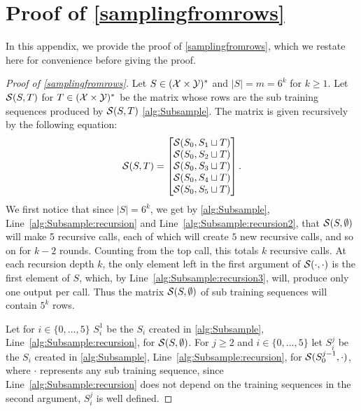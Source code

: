\section{Proof of \cref{samplingfromrows}}\label{appendixefficentoptimalpaclearner}
In this appendix, we provide the proof of \cref{samplingfromrows}, which we restate here for convenience before giving the proof.
\samplingfromrows*

\begin{proof}[Proof of \cref{samplingfromrows}]
    Let $S\in (\mathcal{X}\times \mathcal{Y})^{*}$ and $|S|=m=6^{k}$ for $k\geq 1$. Let $\mathcal{S}(S,T)$ for $T\in (\mathcal{X}\times \mathcal{Y})^{*}$ be the matrix whose rows are the sub training sequences produced by $\mathcal{S}(S,T)$ \cref{alg:Subsample}. The matrix is given recursively by the following equation:  
    \begin{align*}
      \mathcal{S}(S,T)=
      \begin{bmatrix}
        \mathcal{S}(S_0,S_{1}\sqcup T)\\
        \mathcal{S}(S_0,S_{2}\sqcup T)\\
        \mathcal{S}(S_{0},S_{3}\sqcup T)\\
        \mathcal{S}(S_{0},S_{4}\sqcup T)\\
        \mathcal{S}(S_{0},S_{5}\sqcup T)
      \end{bmatrix}.
    \end{align*}
  We first notice that since $|S|=6^{k}$, we get by \cref{alg:Subsample}, Line~\ref{alg:Subsample:recursion} and Line~\ref{alg:Subsample:recursion2}, that   $\mathcal{S}(S,\emptyset)$ will make 5 recursive calls, each of which will create $5$ new recursive calls, and so on for $k-2$ rounds. Counting from the top call, this totals $k$ recursive calls. At each recursion depth $k$, the only element left in the first argument of $\mathcal{S}(\cdot,\cdot)$ is the first element of $S$, which, by Line~\ref{alg:Subsample:recursion3}, will, produce only one output per call. Thus the matrix $\mathcal{S}(S,\emptyset)$ of sub training sequences will contain $5^{k}$ rows. 
  
Let for $ i\in\{  0,\ldots,5\}  $  $S_{i}^{1}$ be the $S_i$ created in \cref{alg:Subsample}, Line~\ref{alg:Subsample:recursion}, for $\mathcal{S}(S,\emptyset)$. For $j\geq 2$ and $ i\in \{  0,\ldots,5\}  $  let $S_{i}^{j}$ be the $S_i$ created in \cref{alg:Subsample}, Line~\ref{alg:Subsample:recursion}, for $\mathcal{S}(S_{0}^{j-1},\cdot)$, where $\cdot$ represents any sub training sequence, since Line~\ref{alg:Subsample:recursion} does not depend on the training sequences in the second argument, $S_{i}^{j}$ is well defined. 


\end{proof}
